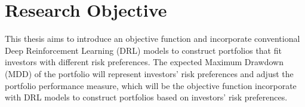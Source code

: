 \section {Research Objective}
This thesis aims to introduce an objective function and incorporate conventional Deep Reinforcement Learning (DRL) models to construct portfolios that fit investors with different risk preferences. The expected Maximum Drawdown (MDD) of the portfolio will represent investors' risk preferences and adjust the portfolio performance measure, which will be the objective function incorporate with DRL models to construct portfolios based on investors' risk preferences.